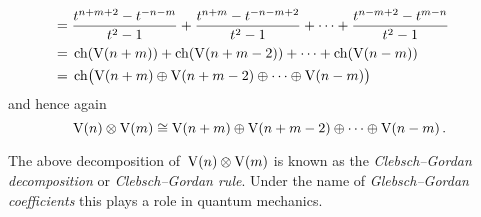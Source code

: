 \begin{itemize}
\begin{align*}
      \\
      ={}&
        \frac{t^{n+m+2} - t^{-n-m}}{t^2 - 1}
      + \frac{t^{n+m} - t^{-n-m+2}}{t^2 - 1}
      + \dotsb
      + \frac{t^{n-m+2} - t^{m-n}}{t^2 - 1}
      \\
      ={}&
      \operatorname{ch}(\operatorname{V}(n+m)) + \operatorname{ch}(\operatorname{V}(n+m-2)) + \dotsb + \operatorname{ch}(\operatorname{V}(n-m))
      \\
      ={}&
      \operatorname{ch}\bigl( \operatorname{V}(n+m) \oplus \operatorname{V}(n+m-2) \oplus \dotsb \oplus \operatorname{V}(n-m) \bigr)
    \end{align*}
    and hence again
    \[
      \operatorname{V}(n) \otimes \operatorname{V}(m)
      \cong
      \operatorname{V}(n+m) \oplus \operatorname{V}(n+m-2) \oplus \dotsb \oplus \operatorname{V}(n-m) \,.
    \]
\end{itemize}

The above decomposition of~$\operatorname{V}(n) \otimes \operatorname{V}(m)$ is known as the \emph{Clebsch--Gordan decomposition} or \emph{Clebsch--Gordan rule}.
Under the name of \emph{Glebsch--Gordan coefficients} this plays a role in quantum mechanics.




